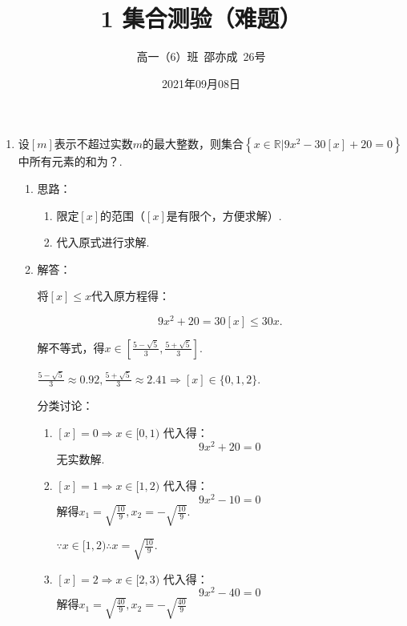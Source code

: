 \documentclass[8pt]{article}
\author{高一（6）班\ 邵亦成\ 26号}
\title{1 集合测验（难题）}
\date{2021年09月08日}
\begin{document}
	\maketitle

	\begin{enumerate}

		\item
			设$\left[m\right]$表示不超过实数$m$的最大整数，则集合$\left\{x\in\mathbb{R}|9x^2-30\left[x\right]+20=0\right\}$中所有元素的和为？.

			\begin{enumerate}

				\item
					思路：
						\begin{enumerate}

							\item
								限定$\left[x\right]$的范围（$[x]$是有限个，方便求解）.

							\item
								代入原式进行求解.

						\end{enumerate}

				\item
					解答：

					将$[x]\leq x$代入原方程得：

					$$9x^2+20=30[x]\leq30x.$$

					解不等式，得$x\in \left[\frac{5-\sqrt{5}}{3},\frac{5+\sqrt{5}}{3}\right]$.

					$\frac{5-\sqrt{5}}{3}\approx0.92, \frac{5+\sqrt{5}}{3}\approx2.41 \Rightarrow [x] \in \{0,1,2\}$.

					分类讨论：

					\begin{enumerate} [ $1^{\circ}$ ]

						\item
							$[x]=0 \Rightarrow x\in[0,1)$
							代入得：
							$$9x^2+20=0$$
							无实数解.

						\item
							$[x]=1 \Rightarrow x\in[1,2)$
							代入得：
							$$9x^2-10=0$$
							解得$x_1=\sqrt{\frac{10}{9}},x_2=-\sqrt{\frac{10}{9}}$.

							$\because x\in[1,2) \therefore x=\sqrt{\frac{10}{9}}$.

						\item
							$[x]=2 \Rightarrow x\in[2,3)$
							代入得：
							$$9x^2-40=0$$
							解得$x_1=\sqrt{\frac{40}{9}},x_2=-\sqrt{\frac{40}{9}}$


\end{enumerate}
\end{enumerate}
\end{enumerate}
\end{document}
